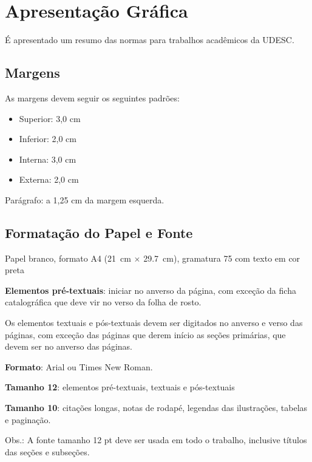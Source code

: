 


\chapter{Apresentação Gráfica}

É apresentado um resumo das normas para trabalhos acadêmicos da UDESC.

\section{Margens}

As margens devem seguir os seguintes padrões:

\begin{itemize}
\item Superior: 3,0 cm
\item Inferior: 2,0 cm
\item Interna: 3,0 cm
\item Externa: 2,0 cm
\end{itemize}

Parágrafo: a 1,25 cm da margem esquerda.

\section{Formatação do Papel e Fonte}

Papel branco, formato A4 (\SI{21}{cm} $\times$ \SI{29,7}{cm}), gramatura 75 com texto em cor preta 

\textbf{Elementos pré-textuais}: iniciar no anverso da página, com exceção da ficha catalográfica que deve vir no verso da folha de rosto.

Os elementos textuais e pós-textuais devem ser digitados no anverso e verso das páginas, com exceção das páginas que derem início as seções primárias, que devem ser no anverso das páginas.


\textbf{Formato}: Arial ou Times New Roman.

\textbf{Tamanho 12}: elementos pré-textuais, textuais e pós-textuais

\textbf{Tamanho 10}: citações longas, notas de rodapé, legendas das ilustrações, tabelas e paginação.

Obs.: A fonte tamanho 12 pt deve ser usada em todo o trabalho, inclusive títulos das seções e
subseções.


